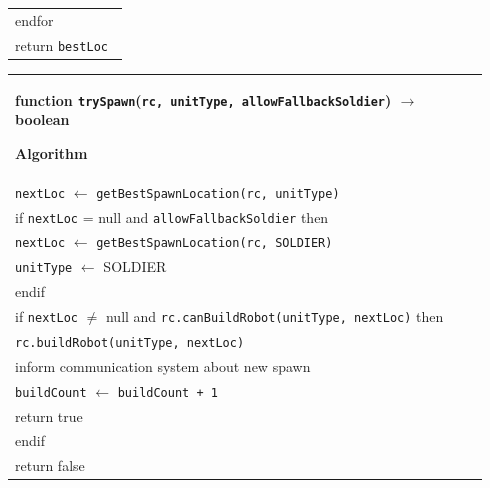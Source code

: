 \documentclass{article}
\newenvironment{pseudobox}
{
\centering
\begin{longtable}{|p{0.94\linewidth}|}
\hline
}
{
\\ \hline
\end{longtable}
\vspace{0.05cm}
}
\begin{document}
\begin{enumerate}[label=\alph*.]
\begin{pseudobox}
\hspace*{1.5em}endfor \\

\hspace*{1.5em}return \texttt{bestLoc}
\end{pseudobox}

\begin{pseudobox}
\textbf{function \texttt{trySpawn}(\texttt{rc, unitType, allowFallbackSoldier}) $\rightarrow$ boolean}

\textbf{Algorithm} \\

\hspace*{1.5em}\texttt{nextLoc} $\leftarrow$ \texttt{getBestSpawnLocation(rc, unitType)} \\

\hspace*{1.5em}if \texttt{nextLoc} = null and \texttt{allowFallbackSoldier} then \\

\hspace*{3em}\texttt{nextLoc} $\leftarrow$ \texttt{getBestSpawnLocation(rc, SOLDIER)} \\
\hspace*{3em}\texttt{unitType} $\leftarrow$ SOLDIER \\

\hspace*{1.5em}endif \\

\hspace*{1.5em}if \texttt{nextLoc} $\neq$ null and \texttt{rc.canBuildRobot(unitType, nextLoc)} then \\

\hspace*{3em}\texttt{rc.buildRobot(unitType, nextLoc)} \\
\hspace*{3em}inform communication system about new spawn \\
\hspace*{3em}\texttt{buildCount} $\leftarrow$ \texttt{buildCount + 1} \\
\hspace*{3em}return true \\

\hspace*{1.5em}endif \\

\hspace*{1.5em}return false
\end{pseudobox}


\end{enumerate}
\end{document}
